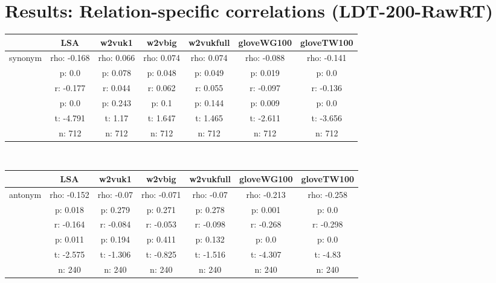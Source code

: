 \documentclass{article}
\begin{document}
\section{Results: Relation-specific correlations (LDT-200-RawRT)}\label{rel}
\begin{tabular}{ccccccc|}\cline{2-7}
&\multicolumn{1}{|c}{LSA} & w2vuk1 & w2vbig & w2vukfull & gloveWG100 & gloveTW100 \\\hline
\multicolumn{1}{|c|}{\multirow{6}{*}{synonym}} & rho: -0.168 & rho: 0.066 & rho: 0.074 & rho: 0.074 & rho: -0.088 & rho: -0.141 \\
\multicolumn{1}{|c|}{} & p: 0.0 & p: 0.078 & p: 0.048 & p: 0.049 & p: 0.019 & p: 0.0 \\
\multicolumn{1}{|c|}{} & r: -0.177 & r: 0.044 & r: 0.062 & r: 0.055 & r: -0.097 & r: -0.136 \\
\multicolumn{1}{|c|}{} & p: 0.0 & p: 0.243 & p: 0.1 & p: 0.144 & p: 0.009 & p: 0.0 \\
\multicolumn{1}{|c|}{} & t: -4.791 & t: 1.17 & t: 1.647 & t: 1.465 & t: -2.611 & t: -3.656 \\
\multicolumn{1}{|c|}{} & n: 712 & n: 712 & n: 712 & n: 712 & n: 712 & n: 712 \\
\hline
\end{tabular}\\
\begin{tabular}{ccccccc|}\cline{2-7}
&\multicolumn{1}{|c}{LSA} & w2vuk1 & w2vbig & w2vukfull & gloveWG100 & gloveTW100 \\\hline
\multicolumn{1}{|c|}{\multirow{6}{*}{antonym}} & rho: -0.152 & rho: -0.07 & rho: -0.071 & rho: -0.07 & rho: -0.213 & rho: -0.258 \\
\multicolumn{1}{|c|}{} & p: 0.018 & p: 0.279 & p: 0.271 & p: 0.278 & p: 0.001 & p: 0.0 \\
\multicolumn{1}{|c|}{} & r: -0.164 & r: -0.084 & r: -0.053 & r: -0.098 & r: -0.268 & r: -0.298 \\
\multicolumn{1}{|c|}{} & p: 0.011 & p: 0.194 & p: 0.411 & p: 0.132 & p: 0.0 & p: 0.0 \\
\multicolumn{1}{|c|}{} & t: -2.575 & t: -1.306 & t: -0.825 & t: -1.516 & t: -4.307 & t: -4.83 \\
\multicolumn{1}{|c|}{} & n: 240 & n: 240 & n: 240 & n: 240 & n: 240 & n: 240 \\
\hline
\end{tabular}\\
\end{document}
